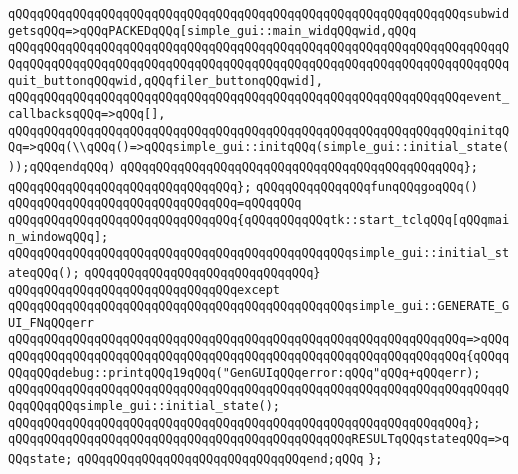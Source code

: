 \verb|qQQqqQQqqQQqqQQqqQQqqQQqqQQqqQQqqQQqqQQqqQQqqQQqqQQqqQQqqQQqqQQqsubwidgetsqQQq=>qQQqPACKEDqQQq[simple_gui::main_widqQQqwid,qQQq|\newline
\verb|qQQqqQQqqQQqqQQqqQQqqQQqqQQqqQQqqQQqqQQqqQQqqQQqqQQqqQQqqQQqqQQqqQQqqQQqqQQqqQQqqQQqqQQqqQQqqQQqqQQqqQQqqQQqqQQqqQQqqQQqqQQqqQQqqQQqqQQqqQQqquit_buttonqQQqwid,qQQqfiler_buttonqQQqwid],|\newline
\verb|qQQqqQQqqQQqqQQqqQQqqQQqqQQqqQQqqQQqqQQqqQQqqQQqqQQqqQQqqQQqqQQqevent_callbacksqQQq=>qQQq[],|\newline
\verb|qQQqqQQqqQQqqQQqqQQqqQQqqQQqqQQqqQQqqQQqqQQqqQQqqQQqqQQqqQQqqQQqinitqQQq=>qQQq(\\qQQq()=>qQQqsimple_gui::initqQQq(simple_gui::initial_state());qQQqendqQQq)|\newline
\verb|qQQqqQQqqQQqqQQqqQQqqQQqqQQqqQQqqQQqqQQqqQQqqQQq};|\newline
\verb|qQQqqQQqqQQqqQQqqQQqqQQqqQQqqQQq};|\newline
\newline
\verb|qQQqqQQqqQQqqQQqfunqQQqgoqQQq()|\newline
\verb|qQQqqQQqqQQqqQQqqQQqqQQqqQQqqQQq=qQQqqQQq|\newline
\verb|qQQqqQQqqQQqqQQqqQQqqQQqqQQqqQQq{qQQqqQQqqQQqtk::start_tclqQQq[qQQqmain_windowqQQq];|\newline
\verb|qQQqqQQqqQQqqQQqqQQqqQQqqQQqqQQqqQQqqQQqqQQqqQQqsimple_gui::initial_stateqQQq();|\newline
\verb|qQQqqQQqqQQqqQQqqQQqqQQqqQQqqQQq}|\newline
\verb|qQQqqQQqqQQqqQQqqQQqqQQqqQQqqQQqexcept|\newline
\verb|qQQqqQQqqQQqqQQqqQQqqQQqqQQqqQQqqQQqqQQqqQQqqQQqsimple_gui::GENERATE_GUI_FNqQQqerr|\newline
\verb|qQQqqQQqqQQqqQQqqQQqqQQqqQQqqQQqqQQqqQQqqQQqqQQqqQQqqQQqqQQqqQQq=>qQQq|\newline
\verb|qQQqqQQqqQQqqQQqqQQqqQQqqQQqqQQqqQQqqQQqqQQqqQQqqQQqqQQqqQQqqQQq{qQQqqQQqqQQqdebug::printqQQq19qQQq("GenGUIqQQqerror:qQQq"qQQq+qQQqerr);|\newline
\verb|qQQqqQQqqQQqqQQqqQQqqQQqqQQqqQQqqQQqqQQqqQQqqQQqqQQqqQQqqQQqqQQqqQQqqQQqqQQqqQQqsimple_gui::initial_state();|\newline
\verb|qQQqqQQqqQQqqQQqqQQqqQQqqQQqqQQqqQQqqQQqqQQqqQQqqQQqqQQqqQQqqQQq};|\newline
\newline
\verb|qQQqqQQqqQQqqQQqqQQqqQQqqQQqqQQqqQQqqQQqqQQqqQQqRESULTqQQqstateqQQq=>qQQqstate;|\newline
\verb|qQQqqQQqqQQqqQQqqQQqqQQqqQQqqQQqend;qQQq|\newline
\verb|};|\newline
\newline

